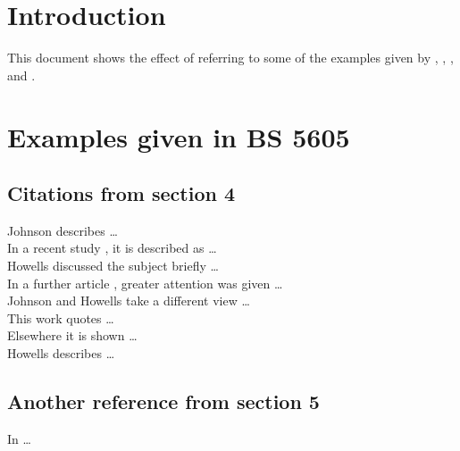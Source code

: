 ﻿%

 
\raggedright
 

 
%
\chapter{Introduction}
 
This document shows the effect of referring to some of the examples given
by \cite{bs-1629}, \cite{bs-5605}, \cite{bs-6371}, \cite{butcher-81} and
\cite{chicago-82}.
 
\chapter{Examples given in BS 5605}
 
\section{Citations from section 4}
 
%
Johnson  describes \dots\\
In a recent study \cite{johnson-74}, it is described as \dots\\
%
Howells  discussed the subject briefly \dots\\
%
In a further article \cite{howells-66-var}, greater attention was
given \dots\\
%
Johnson and Howells  take a different view \dots\\
%
This work \cite{johnson-etc} quotes \dots\\
%
Elsewhere \cite{anon-67} it is shown \dots\\
%
Howells  describes \dots\\
 
\section{Another reference from section 5}
 
In \cite{howells-51} \dots\\
 
